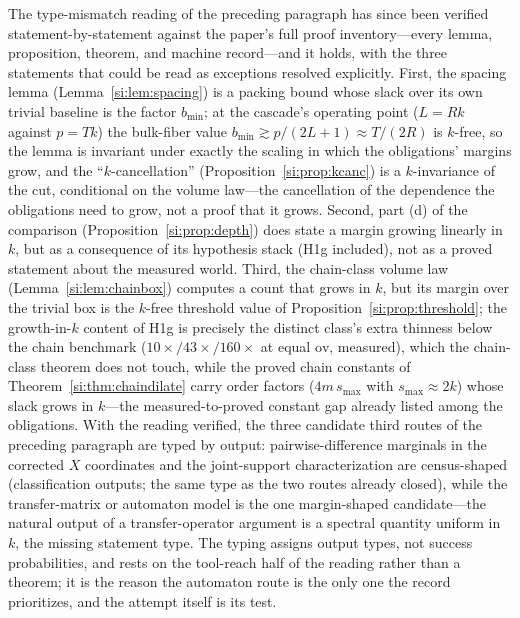 \documentclass[11pt,a4paper]{article}
\numberwithin{equation}{section}
\theoremstyle{plain}
\theoremstyle{plain}
\theoremstyle{definition}
\theoremstyle{remark}
\begin{document}
The type-mismatch reading of the preceding paragraph has since been
verified statement-by-statement against the paper's full proof
inventory---every lemma, proposition, theorem, and machine record---and
it holds, with the three statements that could be read as exceptions
resolved explicitly. First, the spacing lemma (Lemma~\ref{si:lem:spacing})
is a packing bound whose slack over its own trivial baseline is the
factor $b_{\min}$; at the cascade's operating point ($L=Rk$ against
$p=Tk$) the bulk-fiber value $b_{\min}\gtrsim p/(2L+1)\approx T/(2R)$ is
$k$-free, so the lemma is invariant under exactly the scaling in which
the obligations' margins grow, and the ``$k$-cancellation''
(Proposition~\ref{si:prop:kcanc}) is a $k$-invariance of the cut,
conditional on the volume law---the cancellation of the dependence the
obligations need to grow, not a proof that it grows. Second, part (d) of
the comparison (Proposition~\ref{si:prop:depth}) does state a margin
growing linearly in $k$, but as a consequence of its hypothesis stack
(H1g included), not as a proved statement about the measured world.
Third, the chain-class volume law (Lemma~\ref{si:lem:chainbox}) computes a
count that grows in $k$, but its margin over the trivial box is the
$k$-free threshold value of Proposition~\ref{si:prop:threshold}; the
growth-in-$k$ content of H1g is precisely the distinct class's extra
thinness below the chain benchmark ($10\times/43\times/160\times$ at
equal $\mathrm{ov}$, measured), which the chain-class theorem does not
touch, while the proved chain constants of Theorem~\ref{si:thm:chaindilate}
carry order factors ($4m\,s_{\max}$ with $s_{\max}\approx2k$) whose
slack grows in $k$---the measured-to-proved constant gap already listed
among the obligations. With the reading verified, the three candidate
third routes of the preceding paragraph are typed by output:
pairwise-difference marginals in the corrected $X$ coordinates and the
joint-support characterization are census-shaped (classification
outputs; the same type as the two routes already closed), while the
transfer-matrix or automaton model is the one margin-shaped
candidate---the natural output of a transfer-operator argument is a
spectral quantity uniform in $k$, the missing statement type. The typing
assigns output types, not success probabilities, and rests on the
tool-reach half of the reading rather than a theorem; it is the reason
the automaton route is the only one the record prioritizes, and the
attempt itself is its test.
\end{document}
